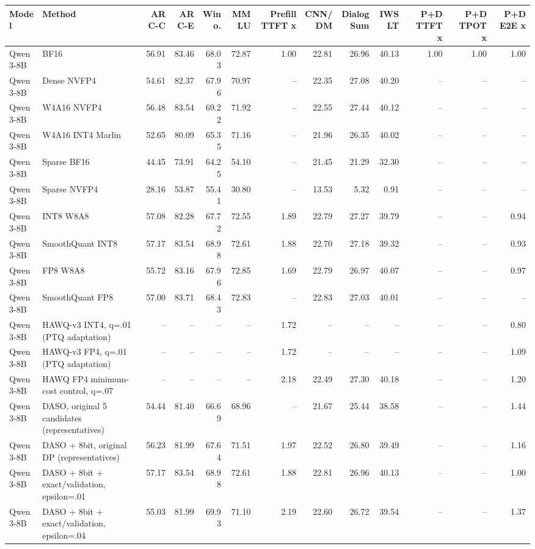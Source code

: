 \begin{tabular}{llrrrrrrrrrrr}
\hline
Model & Method & ARC-C & ARC-E & Wino. & MMLU & Prefill TTFT x & CNN/DM & DialogSum & IWSLT & P+D TTFT x & P+D TPOT x & P+D E2E x \\
\hline
Qwen3-8B & BF16 & 56.91 & 83.46 & 68.03 & 72.87 & 1.00 & 22.81 & 26.96 & 40.13 & 1.00 & 1.00 & 1.00 \\
Qwen3-8B & Dense NVFP4 & 54.61 & 82.37 & 67.96 & 70.97 & -- & 22.35 & 27.08 & 40.20 & -- & -- & -- \\
Qwen3-8B & W4A16 NVFP4 & 56.48 & 83.54 & 69.22 & 71.92 & -- & 22.55 & 27.44 & 40.12 & -- & -- & -- \\
Qwen3-8B & W4A16 INT4 Marlin & 52.65 & 80.09 & 65.35 & 71.16 & -- & 21.96 & 26.35 & 40.02 & -- & -- & -- \\
Qwen3-8B & Sparse BF16 & 44.45 & 73.91 & 64.25 & 54.10 & -- & 21.45 & 21.29 & 32.30 & -- & -- & -- \\
Qwen3-8B & Sparse NVFP4 & 28.16 & 53.87 & 55.41 & 30.80 & -- & 13.53 & 5.32 & 0.91 & -- & -- & -- \\
Qwen3-8B & INT8 W8A8 & 57.08 & 82.28 & 67.72 & 72.55 & 1.89 & 22.79 & 27.27 & 39.79 & -- & -- & 0.94 \\
Qwen3-8B & SmoothQuant INT8 & 57.17 & 83.54 & 68.98 & 72.61 & 1.88 & 22.70 & 27.18 & 39.32 & -- & -- & 0.93 \\
Qwen3-8B & FP8 W8A8 & 55.72 & 83.16 & 67.96 & 72.85 & 1.69 & 22.79 & 26.97 & 40.07 & -- & -- & 0.97 \\
Qwen3-8B & SmoothQuant FP8 & 57.00 & 83.71 & 68.43 & 72.83 & -- & 22.83 & 27.03 & 40.01 & -- & -- & -- \\
Qwen3-8B & HAWQ-v3 INT4, q=.01 (PTQ adaptation) & -- & -- & -- & -- & 1.72 & -- & -- & -- & -- & -- & 0.80 \\
Qwen3-8B & HAWQ-v3 FP4, q=.01 (PTQ adaptation) & -- & -- & -- & -- & 1.72 & -- & -- & -- & -- & -- & 1.09 \\
Qwen3-8B & HAWQ FP4 minimum-cost control, q=.07 & -- & -- & -- & -- & 2.18 & 22.49 & 27.30 & 40.18 & -- & -- & 1.20 \\
Qwen3-8B & DASO, original 5 candidates (representatives) & 54.44 & 81.40 & 66.69 & 68.96 & -- & 21.67 & 25.44 & 38.58 & -- & -- & 1.44 \\
Qwen3-8B & DASO + 8bit, original DP (representatives) & 56.23 & 81.99 & 67.64 & 71.51 & 1.97 & 22.52 & 26.80 & 39.49 & -- & -- & 1.16 \\
Qwen3-8B & DASO + 8bit + exact/validation, epsilon=.01 & 57.17 & 83.54 & 68.98 & 72.61 & 1.88 & 22.81 & 26.96 & 40.13 & -- & -- & 1.00 \\
Qwen3-8B & DASO + 8bit + exact/validation, epsilon=.04 & 55.03 & 81.99 & 69.93 & 71.10 & 2.19 & 22.60 & 26.72 & 39.54 & -- & -- & 1.37 \\
\hline
\end{tabular}
